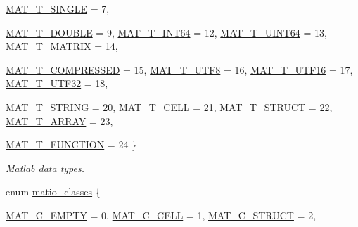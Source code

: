 \begin{DoxyCompactItemize}
\hyperlink{group__MAT_ggacf7b3b879282b7ab3a51190e49bf3453a3a3657d40e9212c923d9b9d03531b64c}{MAT\_\-T\_\-SINGLE} =  7, 
\par
\hyperlink{group__MAT_ggacf7b3b879282b7ab3a51190e49bf3453a31e721ecf7e188196f83c32838288797}{MAT\_\-T\_\-DOUBLE} =  9, 
\hyperlink{group__MAT_ggacf7b3b879282b7ab3a51190e49bf3453a9e825b5d18b8f946eaf2b4b57e51c145}{MAT\_\-T\_\-INT64} =  12, 
\hyperlink{group__MAT_ggacf7b3b879282b7ab3a51190e49bf3453a45547932c46be27118abe08302d7e29f}{MAT\_\-T\_\-UINT64} =  13, 
\hyperlink{group__MAT_ggacf7b3b879282b7ab3a51190e49bf3453a32985fee89a4df8db4b3f5d3a48823d3}{MAT\_\-T\_\-MATRIX} =  14, 
\par
\hyperlink{group__MAT_ggacf7b3b879282b7ab3a51190e49bf3453a30437f2eb3becc2fa6e5d96599d7f724}{MAT\_\-T\_\-COMPRESSED} =  15, 
\hyperlink{group__MAT_ggacf7b3b879282b7ab3a51190e49bf3453ac34ad81f5cbd3b7d0d95e57e5be0149b}{MAT\_\-T\_\-UTF8} =  16, 
\hyperlink{group__MAT_ggacf7b3b879282b7ab3a51190e49bf3453a87ffc0412143c326a1fcc759d5d81bdc}{MAT\_\-T\_\-UTF16} =  17, 
\hyperlink{group__MAT_ggacf7b3b879282b7ab3a51190e49bf3453a11e43c0e0be79b1983090e02ae583109}{MAT\_\-T\_\-UTF32} =  18, 
\par
\hyperlink{group__MAT_ggacf7b3b879282b7ab3a51190e49bf3453a9456a83c0b22022af42461a09d63cdb2}{MAT\_\-T\_\-STRING} =  20, 
\hyperlink{group__MAT_ggacf7b3b879282b7ab3a51190e49bf3453a07599cf2cca6d2b2d059378563318ba5}{MAT\_\-T\_\-CELL} =  21, 
\hyperlink{group__MAT_ggacf7b3b879282b7ab3a51190e49bf3453a4f4d5a6e1d42c6aa81ffb810e5da5c85}{MAT\_\-T\_\-STRUCT} =  22, 
\hyperlink{group__MAT_ggacf7b3b879282b7ab3a51190e49bf3453acf106b0c23021582375f59bc9fce89b1}{MAT\_\-T\_\-ARRAY} =  23, 
\par
\hyperlink{group__MAT_ggacf7b3b879282b7ab3a51190e49bf3453ae76686f267dd1641cd55dce306af6d10}{MAT\_\-T\_\-FUNCTION} =  24
 \}
\begin{DoxyCompactList}\small\item\em Matlab data types. \item\end{DoxyCompactList}\item 
enum \hyperlink{group__MAT_gad4d60ae7b709fc81bfd744fb4c857c40}{matio\_\-classes} \{ \par
\hyperlink{group__MAT_ggad4d60ae7b709fc81bfd744fb4c857c40a5c76eef0ca0373d25abe49053be6fa9a}{MAT\_\-C\_\-EMPTY} =  0, 
\hyperlink{group__MAT_ggad4d60ae7b709fc81bfd744fb4c857c40a2f7abb47a1c51e248bd4e5e03cc81b08}{MAT\_\-C\_\-CELL} =  1, 
\hyperlink{group__MAT_ggad4d60ae7b709fc81bfd744fb4c857c40acb467c7749c80902b798134c729bb521}{MAT\_\-C\_\-STRUCT} =  2, 

\end{DoxyCompactItemize}

